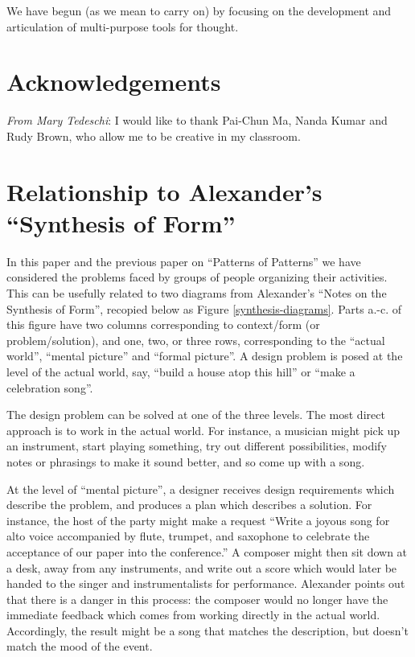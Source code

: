 \documentclass[acmlarge,timestamp]{acmart}
\begin{document}
We have begun (as we mean to carry on) by focusing on the development
and articulation of multi-purpose tools for thought.

\section*{Acknowledgements}
\textit{From Mary Tedeschi}: I would like to thank Pai-Chun Ma, Nanda
Kumar and Rudy Brown, who allow me to be creative in my classroom.

\renewcommand\bibname{References}
\renewcommand\refname{References}




\appendix
\renewcommand\thefigure{\thesection.\arabic{figure}}

\setcounter{figure}{0}
\section{Relationship to Alexander’s “Synthesis of Form”\label{synthesis-of-form}}
In this paper and the previous paper on “Patterns of Patterns” we have
considered the problems faced by groups of people organizing their
activities.  This can be usefully related to two diagrams from
Alexander's ``Notes on the Synthesis of Form'', recopied below as
Figure \ref{synthesis-diagrams}.  Parts a.-c. of this figure have two
columns corresponding to context/form (or problem/solution), and one,
two, or three rows, corresponding to the ``actual world'', ``mental
picture'' and ``formal picture''.  A design problem is posed at the
level of the actual world, say, ``build a house atop this hill'' or
``make a celebration song''.

The design problem can be solved at one of the three levels.  The most
direct approach is to work in the actual world.  For instance, a
musician might pick up an instrument, start playing something, try out
different possibilities, modify notes or phrasings to make it sound
better, and so come up with a song.

At the level of ``mental picture'', a designer receives design
requirements which describe the problem, and produces a plan which
describes a solution.  For instance, the host of the party might make
a request ``Write a joyous song for alto voice accompanied by flute,
trumpet, and saxophone to celebrate the acceptance of our paper into
the conference.''  A composer might then sit down at a desk, away from
any instruments, and write out a score which would later be handed to
the singer and instrumentalists for performance.  Alexander points out
that there is a danger in this process: the composer would no longer
have the immediate feedback which comes from working directly in the
actual world.  Accordingly, the result might be a song that matches
the description, but doesn’t match the mood of the event.
\end{document}

